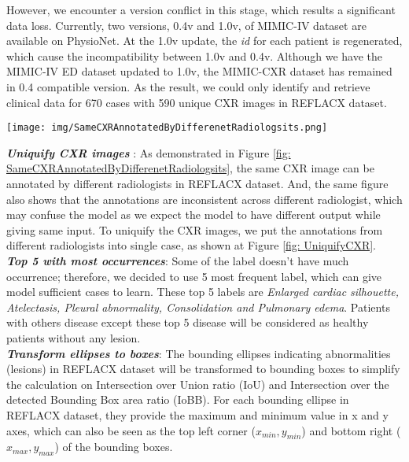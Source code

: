 \documentclass[journal,twoside,web, 11pt]{ieeecolor}
\begin{document}
However, we encounter a version conflict in this stage, which results a significant data loss. Currently, two versions, 0.4v and 1.0v, of MIMIC-IV dataset are available on PhysioNet. At the 1.0v update, the \textit{id} for each patient is regenerated, which cause the incompatibility between 1.0v and 0.4v. Although we have the MIMIC-IV ED dataset updated to 1.0v, the MIMIC-CXR dataset has remained in 0.4 compatible version. As the result, we could only identify and retrieve clinical data for 670 cases with 590 unique CXR images in REFLACX dataset. \\

\begin{figure*}[!h]
    \centering
    \texttt{[image: img/SameCXRAnnotatedByDifferenetRadiologsits.png]}
    \caption{Same CXR image annotated by different radiologists in REFLACX dataset.}
    \label{fig: SameCXRAnnotatedByDifferenetRadiologsits}
\end{figure*}


\textbf{\textit{Uniquify CXR images}} : As demonstrated in Figure \ref{fig: SameCXRAnnotatedByDifferenetRadiologsits}, the same CXR image can be annotated by different radiologists in REFLACX dataset. And, the same figure also shows that the annotations are inconsistent across different radiologist, which may confuse the model as we expect the model to have different output while giving same input. To uniquify the CXR images, we put the annotations from different radiologists into single case, as shown at Figure \ref{fig: UniquifyCXR}.\\

\textbf{\textit{Top 5 with most occurrences}}: Some of the label doesn't have much occurrence; therefore, we decided to use 5 most frequent label, which can give model sufficient cases to learn. These top 5 labels are \textit{Enlarged cardiac silhouette, Atelectasis, Pleural abnormality, Consolidation and Pulmonary edema}. Patients with others disease except these top 5 disease will be considered as healthy patients without any lesion. \\ 

\textbf{\textit{Transform ellipses to boxes}}: The bounding ellipses indicating abnormalities (lesions) in REFLACX dataset will be transformed to bounding boxes to simplify the calculation on Intersection over Union ratio (IoU) and Intersection over the detected Bounding Box area ratio (IoBB). For each bounding ellipse in REFLACX dataset, they provide the maximum and minimum value in x and y axes, which can also be seen as the top left corner ($x_{min}, y_{min}$) and bottom right ($x_{max}, y_{max}$) of the bounding boxes.\\
\end{document}
